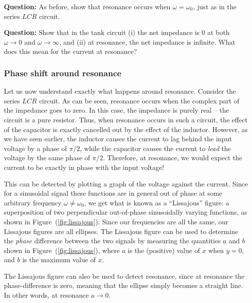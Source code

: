 \begin{question}
    \textbf{Question:} As before, show that resonance occurs when $\omega = \omega_0$, just as in the series $LCR$ circuit.
    
    \textbf{Question:} Show that in the tank circuit (i) the net impedance is $0$ at both $\omega \to 0$ and $\omega\to\infty$, and (ii) at resonance, the net impedance is infinite. What does this mean for the current at resonance?
\end{question}


\subsubsection*{Phase shift around resonance}

Let us now understand exactly what happens around resonance. Consider the series $LCR$ circuit. As can be seen, resonance occurs when the complex part of the impedance goes to zero. In this case, the impedance is purely real -- the circuit is a pure resistor. Thus, when resonance occurs in such a circuit, the effect of the capacitor is exactly cancelled out by the effect of the inductor. However, as we have seen earlier, the inductor causes the current to lag behind the input voltage by a phase of $\pi/2$, while the capacitor causes the current to \textsl{lead} the voltage by the same phase of $\pi/2$. Therefore, at resonance, we would expect the current to be exactly in phase with the input voltage!

This can be detected by plotting a graph of the voltage against the current. Since for a sinusoidal signal these functions are in general out of phase at some arbitrary frequency $\omega \neq \omega_0$, we get what is known as a ``Lissajous'' figure: a superposition of two perpendicular out-of-phase sinusoidally varying functions, as shown in Figure~(\ref{fig:lissajous}). Since our frequencies are all the same, our Lissajous figures are all ellipses. The Lissajous figure can be used to determine the \textsl{phase} difference between the two signals by measuring the quantities $a$ and $b$ shown in Figure~(\ref{fig:lissajous}), where $a$ is the (positive) value of $x$ when $y=0$, and $b$ is the maximum value of $x$. 

The Lissajous figure can also be used to detect resonance, since at resonance the phase-difference is zero, meaning that the ellipse simply becomes a straight line. In other words, at resonance $a\to 0$.

